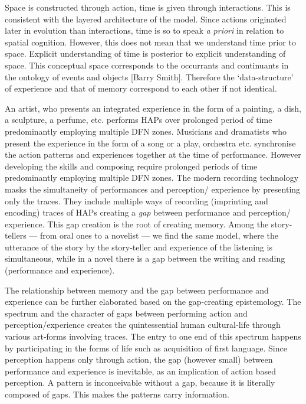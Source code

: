 Space is constructed through action, time is given through interactions. This is consistent with the layered architecture of the model. Since actions originated later in evolution than interactions, time is so to speak \textit{a priori} in relation to spatial cognition. However, this does not mean that we understand time prior to space. Explicit understanding of time is posterior to explicit understanding of space. This conceptual space corresponds to the occurrants and continuants in the ontology of events and objects [Barry Smith]. Therefore the `data-structure' of experience and that of memory correspond to each other if not identical.

An artist, who presents an integrated experience in the form of a painting, a dish, a sculpture, a perfume, etc. performs HAPs over prolonged period of time predominantly employing multiple DFN zones. Musicians and dramatists who present the experience in the form of a song or a play, orchestra etc. synchronise the action patterns and experiences together at the time of performance. However developing the skills and composing require prolonged periods of time predominantly employing multiple DFN zones. The modern recording technology masks the simultaneity of performances and perception/ experience by presenting only the traces. They include multiple ways of recording (imprinting and encoding) traces of HAPs creating a \textit{gap} between performance and perception/ experience. This gap creation is the root of creating memory. Among the story-tellers --- from oral ones to a novelist --- we find the same model, where the utterance of the story by the story-teller and experience of the listening is simultaneous, while in a novel there is a gap between the writing and reading (performance and experience). 

The relationship between memory and the gap between performance and experience can be further elaborated based on the gap-creating epistemology. The spectrum and the character of gaps between performing action and perception/experience creates the quintessential human cultural-life through various art-forms involving traces. The entry to one end of this spectrum happens by participating in the forms of life such as acquisition of first language. Since perception happens only through action, the gap (however small) between performance and experience is inevitable, as an implication of action based perception. A pattern is inconceivable without a gap, because it is literally composed of gaps. This makes the patterns carry information.

